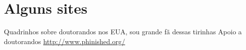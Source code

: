 \chapter{Alguns sites}

\begin{outline}
\1	
\2	Quadrinhos sobre doutorandos nos EUA, sou grande fã dessas tirinhas
\1	
\2	Apoio a doutorandos
\1	\url{http://www.phinished.org/}
\end{outline}

